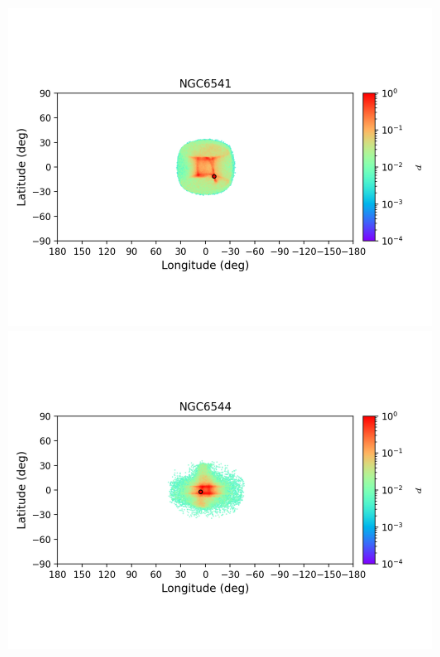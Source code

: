         \begin{figure}
            \begin{center}
                \includegraphics[clip=true, trim = 0mm 20mm 0mm 10mm, width=1\columnwidth]{images/error_plots_NGC6541.png}
                \includegraphics[clip=true, trim = 0mm 20mm 0mm 10mm, width=1\columnwidth]{images/error_plots_NGC6544.png}
                

\end{center}
\end{figure}
